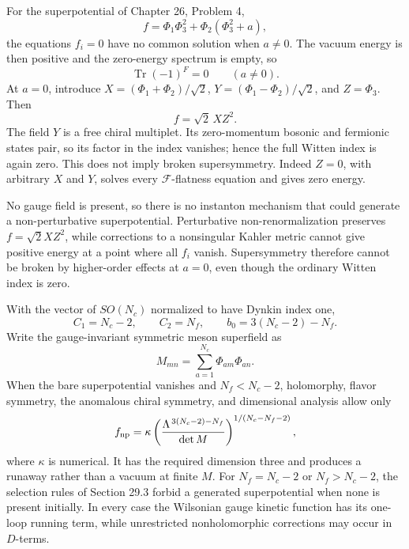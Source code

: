 \ExerciseEditorialNote

\begin{enumerate}
  For the superpotential of Chapter 26, Problem 4,
  \[
    f=\Phi_1\Phi_3^2+\Phi_2(\Phi_3^2+a),
  \]
  the equations \(f_i=0\) have no common solution when \(a\ne0\).
  The vacuum energy is then positive and the zero-energy spectrum is
  empty, so
  \[
    \operatorname{Tr}(-1)^F=0\qquad(a\ne0).
  \]
  At \(a=0\), introduce
  \(X=(\Phi_1+\Phi_2)/\sqrt2\),
  \(Y=(\Phi_1-\Phi_2)/\sqrt2\), and \(Z=\Phi_3\).  Then
  \[
    f=\sqrt2\,XZ^2.
  \]
  The field \(Y\) is a free chiral multiplet.  Its zero-momentum bosonic
  and fermionic states pair, so its factor in the index vanishes; hence
  the full Witten index is again zero.  This does not imply broken
  supersymmetry.  Indeed \(Z=0\), with arbitrary \(X\) and \(Y\), solves
  every \(\mathcal F\)-flatness equation and gives zero energy.

  No gauge field is present, so there is no instanton mechanism that
  could generate a non-perturbative superpotential.  Perturbative
  non-renormalization preserves \(f=\sqrt2XZ^2\), while corrections to a
  nonsingular Kahler metric cannot give positive energy at a point where
  all \(f_i\) vanish.  Supersymmetry therefore cannot be broken by
  higher-order effects at \(a=0\), even though the ordinary Witten index
  is zero.

  With the vector of \(SO(N_c)\) normalized to have Dynkin index one,
  \[
    C_1=N_c-2,\qquad C_2=N_f,\qquad
    b_0=3(N_c-2)-N_f.
  \]
  Write the gauge-invariant symmetric meson superfield as
  \[
    M_{mn}=\sum_{a=1}^{N_c}\Phi_{am}\Phi_{an}.
  \]
  When the bare superpotential vanishes and \(N_f<N_c-2\), holomorphy,
  flavor symmetry, the anomalous chiral symmetry, and dimensional
  analysis allow only
  \[
    f_{\rm np}
      =\kappa
       \left(
         \frac{\Lambda^{\,3(N_c-2)-N_f}}{\det M}
       \right)^{1/(N_c-N_f-2)},
  \]
  where \(\kappa\) is numerical.  It has the required dimension three
  and produces a runaway rather than a vacuum at finite \(M\).
  For \(N_f=N_c-2\) or \(N_f>N_c-2\), the selection rules of
  Section 29.3 forbid a generated superpotential when none is present
  initially.  In every case the Wilsonian gauge kinetic function has
  its one-loop running term, while unrestricted nonholomorphic
  corrections may occur in \(D\)-terms.


\end{enumerate}

